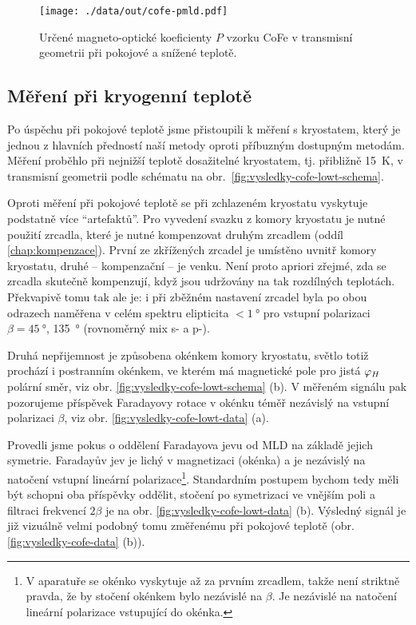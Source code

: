 \begin{figure}[htbp]
    \centering
    \texttt{[image: ./data/out/cofe-pmld.pdf]}
    \caption{Určené magneto-optické koeficienty $P$ vzorku CoFe v transmisní geometrii při pokojové a snížené teplotě.}
    \label{fig:vysledky-cofe-PMLD}
\end{figure}



\subsection{Měření při kryogenní teplotě}
\label{chap:vysledky-cofe-lowt}

Po úspěchu při pokojové teplotě jsme přistoupili k měření s kryostatem, který je jednou z hlavních předností naší metody oproti příbuzným dostupným metodám.
Měření proběhlo při nejnižší teplotě dosažitelné kryostatem, tj. přibližně \SI{15}{\kelvin}, v transmisní geometrii podle schématu na obr.~\ref{fig:vysledky-cofe-lowt-schema}.

Oproti měření při pokojové teplotě se při zchlazeném kryostatu vyskytuje podstatně více ``artefaktů''.
Pro vyvedení svazku z komory kryostatu je nutné použití zrcadla, které je nutné kompenzovat druhým zrcadlem (oddíl \ref{chap:kompenzace}).
První ze zkřížených zrcadel je umístěno uvnitř komory kryostatu, druhé -- kompenzační -- je venku.
Není proto apriori zřejmé, zda se zrcadla skutečně kompenzují, když jsou udržovány na tak rozdílných teplotách.
Překvapivě tomu tak ale je: i při zběžném nastavení zrcadel byla po obou odrazech naměřena v celém spektru elipticita $<\SI{1}{\degree}$ pro vstupní polarizaci $\beta=\SI{45}{\degree}$, \SI{135}{\degree} (rovnoměrný mix s- a p-).

Druhá nepřijemnost je způsobena okénkem komory kryostatu, světlo totiž prochází i postranním okénkem, ve kterém má magnetické pole pro jistá $\varphi_H$ polární směr, viz obr. \ref{fig:vysledky-cofe-lowt-schema} (b).
V měřeném signálu pak pozorujeme příspěvek Faradayovy rotace v okénku téměř nezávislý na vstupní polarizaci $\beta$, viz obr. \ref{fig:vysledky-cofe-lowt-data} (a).

Provedli jsme pokus o oddělení Faradayova jevu od MLD na základě jejich symetrie.
Faradayův jev je lichý v magnetizaci (okénka) a je nezávislý na natočení vstupní lineární polarizace\footnote{V aparatuře se okénko vyskytuje až za prvním zrcadlem, takže není striktně pravda, že by stočení okénkem bylo nezávislé na $\beta$. Je nezávislé na natočení lineární polarizace vstupující do okénka.}.
Standardním postupem bychom tedy měli být schopni oba příspěvky oddělit, stočení po symetrizaci ve vnějším poli a filtraci frekvencí $2\beta$ je na obr. \ref{fig:vysledky-cofe-lowt-data} (b).
Výsledný signál je již vizuálně velmi podobný tomu změřenému při pokojové teplotě (obr. \ref{fig:vysledky-cofe-data} (b)).

